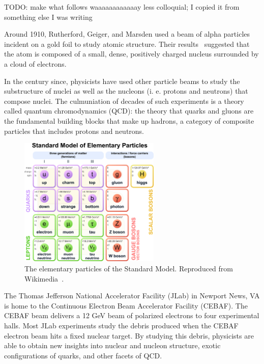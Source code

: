 TODO: make what follows waaaaaaaaaaaay less colloquial; I copied it from something else I was writing

Around 1910, Rutherford, Geiger, and Marsden used a beam of alpha particles
incident on a gold foil to study atomic structure.
Their results~\cite{Rutherford_1911} suggested that the atom is composed of a
small, dense, positively charged nucleus surrounded by a cloud of electrons.

In the century since, physicists have used other particle beams to study the
substructure of nuclei as well as the nucleons (i.  e.  protons and neutrons)
that compose nuclei.
The culmuniation of decades of such experiments is a theory called quantum
chromodynamics (QCD): the theory that quarks and gluons are the fundamental
building blocks that make up hadrons, a category of composite particles that
includes protons and neutrons.

\begin{figure}[!h]
    \centering
    \includegraphics[width=0.6\textwidth]{chap1/Standard_Model_of_Elementary_Particles.pdf}
    \caption{The elementary particles of the Standard Model. Reproduced from
             Wikimedia~\cite{standard_model_wikimedia}.
            }
    \label{fig:Standard_Model_of_Elementary_Particles}
\end{figure}

The Thomas Jefferson National Accelerator Facility (JLab) in Newport News, VA
is home to the Continuous Electron Beam Accelerator Facility (CEBAF).
The CEBAF beam delivers a 12 GeV beam of polarized electrons to four
experimental halls.
Most JLab experiments study the debris produced when the CEBAF electron beam
hits a fixed nuclear target.
By studying this debris, physicists are able to obtain new insights into
nuclear and nucleon structure, exotic configurations of quarks, and other
facets of QCD.

